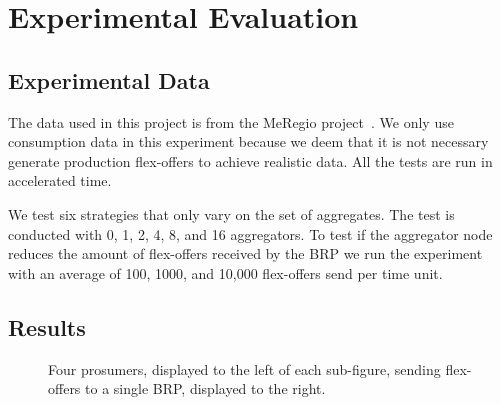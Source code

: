 \documentclass{ifacconf}
\begin{document}
\section{Experimental Evaluation}
\subsection{Experimental Data}

The data used in this project is from the MeRegio project~\cite{meregio}. 
We only use consumption data in this experiment because we deem that it is not necessary generate production flex-offers to achieve realistic data.  
All the tests are run in accelerated time.


We test six strategies that only vary on the set of aggregates. The test is conducted with 0, 1, 2, 4, 8, and 16 aggregators. 
To test if the aggregator node reduces the amount of flex-offers received by the BRP we run the experiment with an average of 100, 1000, and 10,000 flex-offers send per time unit. 

\subsection{Results}

\begin{figure}[]
   \centering
  \caption{Four prosumers, displayed to the left of each sub-figure, sending flex-offers to a single BRP, displayed to the right.}
  \label{fig:communicationservice}
\end{figure}
\end{document}
